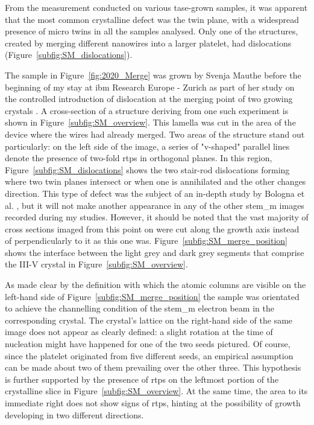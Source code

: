 From the measurement conducted on various \acs{tase}-grown samples, it was apparent that the most common crystalline defect was the twin plane, with a widespread presence of micro twins in all the samples analysed. Only one of the structures, created by merging different nanowires into a larger platelet, had dislocations (Figure~\ref{subfig:SM_dislocations}). 
\par
The sample in Figure~\ref{fig:2020_Merge} was grown by Svenja Mauthe before the beginning of my stay at \acs{ibm} Research Europe - Zurich as part of her study on the controlled introduction of dislocation at the merging point of two growing crystals \cite{Mauthe2021}. A cross-section of a structure deriving from one such experiment is shown in Figure~\ref{subfig:SM_overview}. This lamella was cut in the area of the device where the wires had already merged. Two areas of the structure stand out particularly: on the left side of the image, a series of "v-shaped" parallel lines denote the presence of two-fold \acf{rtp}s in orthogonal  planes. In this region, Figure~\ref{subfig:SM_dislocations} shows the two stair-rod dislocations forming where two twin planes intersect or when one is annihilated and the other changes direction. This type of defect was the subject of an in-depth study by Bologna et al. \cite{Bologna2018}, but it will not make another appearance in any of the other \acf{stem_m} images recorded during my studies. However, it should be noted that the vast majority of cross sections imaged from this point on were cut along the growth axis instead of perpendicularly to it as this one was. Figure~\ref{subfig:SM_merge_position} shows the interface between the light grey and dark grey segments that comprise the III-V crystal in Figure~\ref{subfig:SM_overview}. 
\par
As made clear by the definition with which the atomic columns are visible on the left-hand side of Figure~\ref{subfig:SM_merge_position} the sample was orientated to achieve the channelling condition of the \acs{stem_m} electron beam in the corresponding crystal. The crystal's lattice on the right-hand side of the same image does not appear as clearly defined: a slight rotation at the time of nucleation might have happened for one of the two seeds pictured. Of course, since the platelet originated from five different seeds, an empirical assumption can be made about two of them prevailing over the other three. This hypothesis is further supported by the presence of \acs{rtp}s on the leftmost portion of the crystalline slice in Figure~\ref{subfig:SM_overview}. At the same time, the area to its immediate right does not show signs of \acs{rtp}s, hinting at the possibility of growth developing in two different directions. 

